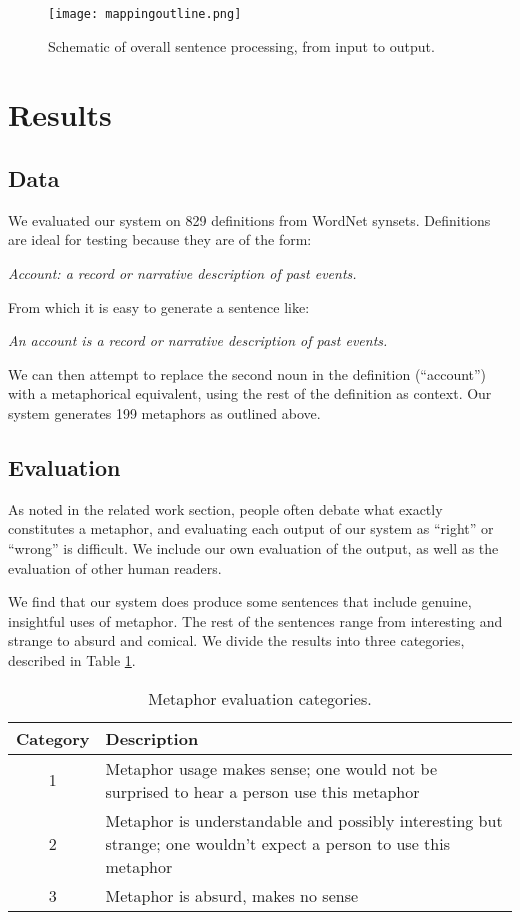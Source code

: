 \documentclass[12pt]{article}
\begin{document}
\begin{figure}[h]
	\centering
	\texttt{[image: mappingoutline.png]}
	\caption{Schematic of overall sentence processing, from input to output.}
	\label{fig:mapoutline}
\end{figure}

\section{Results}

\subsection{Data}
We evaluated our system on 829 definitions from WordNet synsets. Definitions are ideal for testing because they are of the form:

\begin{center}
    \emph{Account: a record or narrative description of past events.}
\end{center}

From which it is easy to generate a sentence like:

\begin{center}
    \emph{An account is a record or narrative description of past events.}
\end{center}

We can then attempt to replace the second noun in the definition (``account'') with a metaphorical equivalent, using the rest of the definition as context. Our system generates 199 metaphors as outlined above.

\subsection{Evaluation}

As noted in the related work section, people often debate what exactly constitutes a metaphor, and evaluating each output of our system as ``right'' or ``wrong'' is difficult. We include our own evaluation of the output, as well as the evaluation of other human readers.

We find that our system does produce some sentences that include genuine, insightful uses of metaphor. The rest of the sentences range from interesting and strange to absurd and comical. We divide the results into three categories, described in Table \ref{tab:evalcats}.

\begin{table}[h]
	\centering
	\small
	\begin{tabular}{|c|p{12cm}|} \hline
		\textbf{Category} & \textbf{Description}\\ \hline
		1 & Metaphor usage makes sense; one would not be surprised to hear a person use this metaphor\\ \hline
        2 & Metaphor is understandable and possibly interesting but strange; one wouldn’t expect a person to use this metaphor\\ \hline
		3 & Metaphor is absurd, makes no sense\\ \hline
	\end{tabular}
	\caption{Metaphor evaluation categories.}
	\label{tab:evalcats}
\end{table}
\end{document}
